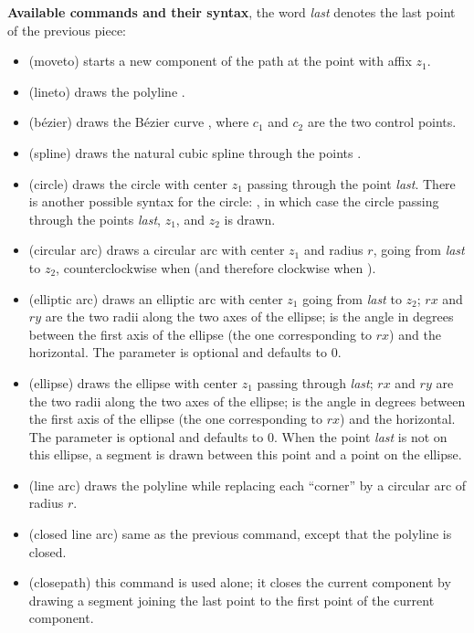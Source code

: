 \noindent\textbf{Available commands and their syntax}, the word \emph{last} denotes the last point of the previous piece:
\begin{itemize}
  \item {} (moveto) starts a new component of the path at the point with affix $z_1$.
  \item {} (lineto) draws the polyline .
  \item {} (bézier) draws the Bézier curve , where $c_1$ and $c_2$ are the two control points.
  \item {} (spline) draws the natural cubic spline through the points .
  \item {} (circle) draws the circle with center $z_1$ passing through the point \emph{last}. There is another possible syntax for the circle: , in which case the circle passing through the points \emph{last}, $z_1$, and $z_2$ is drawn.
  \item {} (circular arc) draws a circular arc with center $z_1$ and radius $r$, going from \emph{last} to $z_2$, counterclockwise when  (and therefore clockwise when ).
  \item {} (elliptic arc) draws an elliptic arc with center $z_1$ going from \emph{last} to $z_2$; $rx$ and $ry$ are the two radii along the two axes of the ellipse;  is the angle in degrees between the first axis of the ellipse (the one corresponding to $rx$) and the horizontal. The parameter  is optional and defaults to $0$.
  \item {} (ellipse) draws the ellipse with center $z_1$ passing through \emph{last}; $rx$ and $ry$ are the two radii along the two axes of the ellipse;  is the angle in degrees between the first axis of the ellipse (the one corresponding to $rx$) and the horizontal. The parameter  is optional and defaults to $0$. When the point \emph{last} is not on this ellipse, a segment is drawn between this point and a point on the ellipse.
  \item {} (line arc) draws the polyline  while replacing each “corner” by a circular arc of radius $r$.
  \item {} (closed line arc) same as the previous command, except that the polyline is closed.
  \item {} (closepath) this command is used alone; it closes the current component by drawing a segment joining the last point to the first point of the current component.
\end{itemize}


